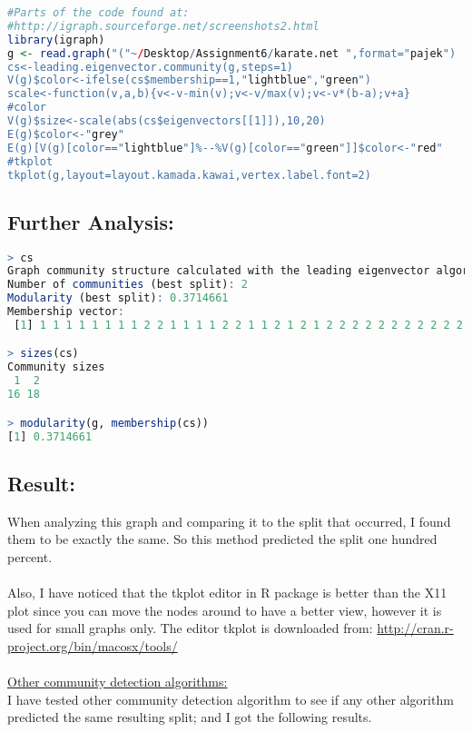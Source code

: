 \documentclass[letterpaper,11pt]{article}
\begin{document}
\begin{lstlisting}[language=R,frame=single]
#Parts of the code found at:
#http://igraph.sourceforge.net/screenshots2.html
library(igraph)
g <- read.graph("("~/Desktop/Assignment6/karate.net ",format="pajek")
cs<-leading.eigenvector.community(g,steps=1)
V(g)$color<-ifelse(cs$membership==1,"lightblue","green")
scale<-function(v,a,b){v<-v-min(v);v<-v/max(v);v<-v*(b-a);v+a}
#color
V(g)$size<-scale(abs(cs$eigenvectors[[1]]),10,20)
E(g)$color<-"grey"
E(g)[V(g)[color=="lightblue"]%--%V(g)[color=="green"]]$color<-"red"
#tkplot
tkplot(g,layout=layout.kamada.kawai,vertex.label.font=2)
\end{lstlisting}

\noindent
\begin{minipage}{\linewidth}
\label{visina8}
\end{minipage}

\subsection*{Further Analysis:}

\begin{lstlisting}[language=R,frame=single]
> cs
Graph community structure calculated with the leading eigenvector algorithm
Number of communities (best split): 2 
Modularity (best split): 0.3714661 
Membership vector:
 [1] 1 1 1 1 1 1 1 1 2 2 1 1 1 1 2 2 1 1 2 1 2 1 2 2 2 2 2 2 2 2 2 2 2 2

> sizes(cs)
Community sizes
 1  2 
16 18

> modularity(g, membership(cs))
[1] 0.3714661
\end{lstlisting}

\subsection*{Result:}
When analyzing this graph and comparing it to the split that occurred, I found them to be exactly the same. So this method predicted the split one hundred percent.\\
\\
Also, I have noticed that the tkplot editor in R package is better than the X11 plot since you can move the nodes around to have a better view, however it is used for small graphs only. The editor tkplot is downloaded from: \url{http://cran.r-project.org/bin/macosx/tools/}
\\
\\
\uline{Other community detection algorithms:}\\
I have tested other community detection algorithm to see if any other algorithm predicted the same resulting split; and I got the following results.\\
\end{document}
